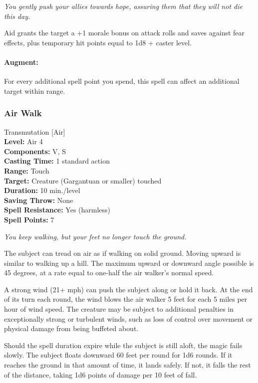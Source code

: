 \emph{You gently push your allies towards hope, assuring them that they will not die this day.}

Aid grants the target a +1 morale bonus on attack rolls and saves against fear effects, plus temporary hit points equal to 1d8 + caster level.

\paragraph{Augment:} For every additional spell point you spend, this spell can affect an additional target within range.
\subsubsection{Air Walk}
\label{Spell:AirWalk}
Transmutation [Air]
\\ \textbf{Level:} Air 4
\\ \textbf{Components:} V, S
\\ \textbf{Casting Time:} 1 standard action
\\ \textbf{Range:} Touch
\\ \textbf{Target:} Creature (Gargantuan or smaller) touched
\\ \textbf{Duration:} 10 min./level
\\ \textbf{Saving Throw:} None
\\ \textbf{Spell Resistance:} Yes (harmless)
\\ \textbf{Spell Points:} 7

\emph{You keep walking, but your feet no longer touch the ground.}

The subject can tread on air as if walking on solid ground. 
Moving upward is similar to walking up a hill. 
The maximum upward or downward angle possible is 45 degrees, at a rate equal to one-half the air walker's normal speed.

A strong wind (21+ mph) can push the subject along or hold it back. At the end of its turn each round, the wind blows the air walker 5 feet for each 5 miles per hour of wind speed. 
The creature may be subject to additional penalties in exceptionally strong or turbulent winds, such as loss of control over movement or physical damage from being buffeted about.

Should the spell duration expire while the subject is still aloft, the magic fails slowly. 
The subject floats downward 60 feet per round for 1d6 rounds. 
If it reaches the ground in that amount of time, it lands safely. 
If not, it falls the rest of the distance, taking 1d6 points of damage per 10 feet of fall. 

